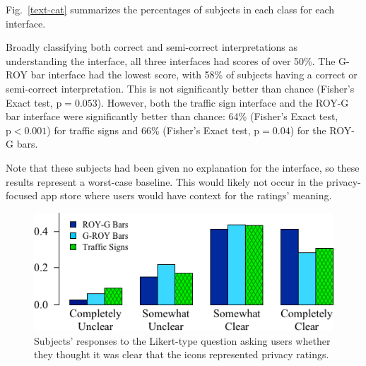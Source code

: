 \documentclass[11pt]{article}
\begin{document}
Fig.~\ref{text-cat} summarizes the percentages of subjects in
each class for each interface.




Broadly classifying both correct and semi-correct
interpretations as understanding the interface,
all three interfaces had scores of over 50\%. 
The G-ROY bar interface had the lowest 
score, with 58\% of 
subjects having a correct or semi-correct interpretation. This is not significantly better 
than chance (Fisher's Exact test, $\mathrm{p}=0.053$). However, both the traffic 
sign interface and the ROY-G bar interface were 
significantly better than chance:
64\% (Fisher's Exact test, $\mathrm{p}<0.001$) for traffic signs and
66\% (Fisher's Exact test, $\mathrm{p}=0.04$) for the ROY-G bars. 

Note that these subjects had been given no explanation for the
interface, so these results represent a worst-case baseline. 
This would likely not occur in
the privacy-focused app store where users would have 
context for the ratings' meaning.

\begin{figure}
\begin{center}
\includegraphics[width=.9\linewidth]{graphs/ClarityHistLikert.png}
    \caption{Subjects' responses to the Likert-type question asking users whether they thought it was clear that the icons represented privacy ratings.}
    \label{likert}\end{center}
\end{figure}
\end{document}
